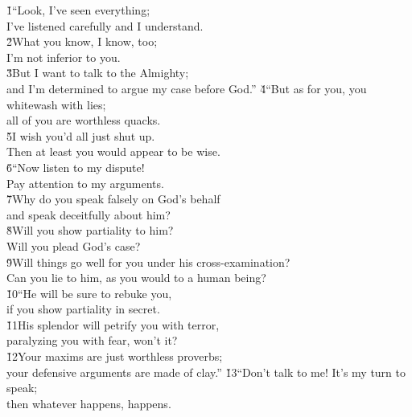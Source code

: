 \begin{poetry}
\poeml {}
\v{1}``Look, I've seen everything; \\
\poemll    I've listened carefully and I understand. \\
\poeml \v{2}What you know, I know, too; \\
\poemll    I'm not inferior to you. \\
\poeml \v{3}But I want to talk to the Almighty; \\
\poemll    and I'm determined to argue my case before God.''
\poeml \v{4}``But as for you, you whitewash with lies; \\
\poemll    all of you are worthless quacks. \\
\poeml \v{5}I wish you'd all just shut up. \\
\poemll    Then at least you would appear to be wise. \\
\poeml \v{6}``Now listen to my dispute! \\
\poemll    Pay attention to my arguments. \\
\poeml \v{7}Why do you speak falsely on God's behalf \\
\poemll    and speak deceitfully about him? \\
\poeml \v{8}Will you show partiality to him? \\
\poemll    Will you plead God's case? \\
\poeml \v{9}Will things go well for you under his cross-examination? \\
\poemll    Can you lie to him, as you would to a human being? \\
\poeml \v{10}``He will be sure to rebuke you, \\
\poemll    if you show partiality in secret. \\
\poeml \v{11}His splendor will petrify you with terror, \\
\poemll    paralyzing you with fear, won't it? \\
\poeml \v{12}Your maxims are just worthless proverbs; \\
\poemll    your defensive arguments are made of clay.''
\poeml \v{13}``Don't talk to me! It's my turn to speak; \\
\poemll    then whatever happens, happens. \\

\end{poetry}
